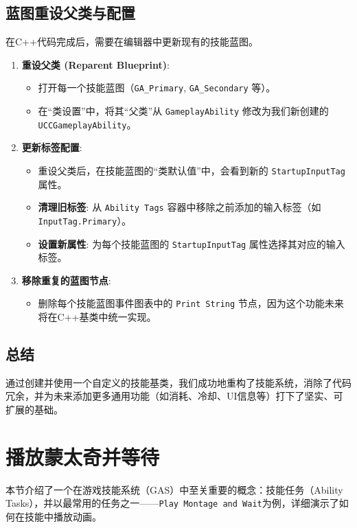 \documentclass[10pt,CJKmath]{zhbook-v1}
\begin{document}
\subsection{蓝图重设父类与配置}
在C++代码完成后，需要在编辑器中更新现有的技能蓝图。
\begin{enumerate}
    \item \textbf{重设父类 (Reparent Blueprint)}:
    \begin{itemize}
        \item 打开每一个技能蓝图（\texttt{GA\_Primary}, \texttt{GA\_Secondary} 等）。
        \item 在“类设置”中，将其“父类”从 \texttt{GameplayAbility} 修改为我们新创建的 \texttt{UCCGameplayAbility}。
    \end{itemize}
    \item \textbf{更新标签配置}:
    \begin{itemize}
        \item 重设父类后，在技能蓝图的“类默认值”中，会看到新的 \texttt{StartupInputTag} 属性。
        \item \textbf{清理旧标签}: 从 \texttt{Ability Tags} 容器中移除之前添加的输入标签（如 \texttt{InputTag.Primary}）。
        \item \textbf{设置新属性}: 为每个技能蓝图的 \texttt{StartupInputTag} 属性选择其对应的输入标签。
    \end{itemize}
    \item \textbf{移除重复的蓝图节点}:
    \begin{itemize}
        \item 删除每个技能蓝图事件图表中的 \texttt{Print String} 节点，因为这个功能未来将在C++基类中统一实现。
    \end{itemize}
\end{enumerate}

\subsection{总结}
通过创建并使用一个自定义的技能基类，我们成功地重构了技能系统，消除了代码冗余，并为未来添加更多通用功能（如消耗、冷却、UI信息等）打下了坚实、可扩展的基础。

\section{播放蒙太奇并等待}
本节介绍了一个在游戏技能系统（GAS）中至关重要的概念：技能任务（Ability Tasks），并以最常用的任务之一——\texttt{Play Montage and Wait}为例，详细演示了如何在技能中播放动画。
\end{document}
